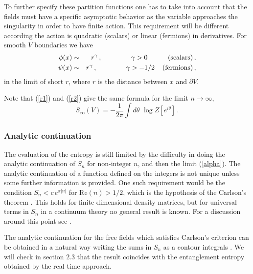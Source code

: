 \documentclass[11pt]{article}
\begin{document}
To further specify these partition functions one has to take into account that the fields must have a specific asymptotic behavior as the variable approaches the singularity in order to have finite action. This requirement will be different according the action is quadratic (scalars) or linear (fermions) in derivatives. For smooth $V$ boundaries we have 
\begin{eqnarray}
\phi(x) &\sim& r^\gamma\,,\hspace{1.5cm} \gamma > 0 \hspace{1.05cm}\textrm{(scalars)}\,,\label{chia}\\
\psi(x) &\sim& r^\gamma\,, \hspace{1.5cm}  \gamma > -1/2  \hspace{.4cm}\textrm{(fermions)} \,,
\label{choa}\end{eqnarray}
in the limit of short $r$, where $r$ is the distance between $x$ and $\partial V$. 

Note that (\ref{r1}) and (\ref{r2}) give the same formula for the limit $n\rightarrow \infty$,
\begin{equation}
S_\infty(V)=-\frac{1}{2 \pi} \int d\theta\,\, \log Z[e^{i \theta}]\,.
\end{equation}

\subsubsection{Analytic continuation}
The evaluation of the entropy is still limited by the difficulty in doing the analytic continuation of  $S_n$ for non-integer $n$, and then the limit (\ref{alpha}). The analytic continuation of a function defined on the integers is not unique unless some further information is provided. One such requirement would be the condition $S_n<c\, e^{\pi |n| }$ for Re$(n)>1/2$, which is the hypothesis of the Carlson's theorem \cite{ccd,carl}. This holds for finite dimensional density matrices, but for universal terms in $S_n$ in a continuum theory no general result is known. For a discussion around this point see \cite{ccd,d1}. 

The analytic continuation for the free fields which satisfies Carlson's criterion can be obtained  in a natural way writing the sums in $S_n$ as a contour integrals \cite{chana}. We will check in section 2.3 that the result coincides with the entanglement entropy obtained by the real time approach. 
\end{document}

